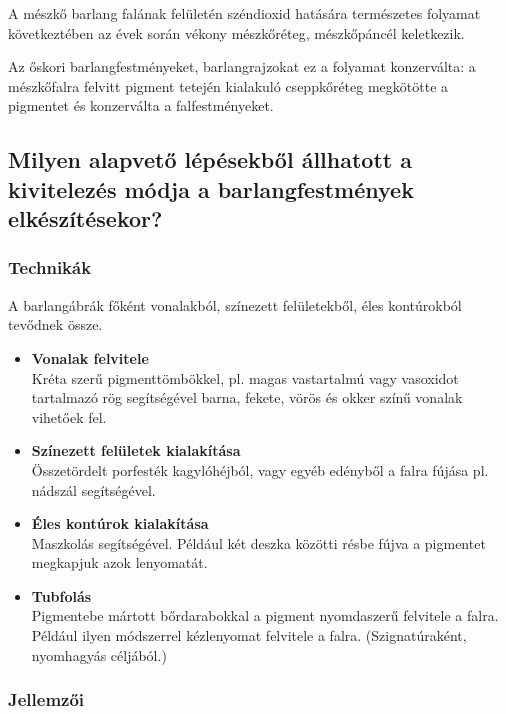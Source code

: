 		A mészkő barlang falának felületén széndioxid hatására természetes folyamat következtében az évek során vékony mészkőréteg, mészkőpáncél keletkezik. 
		
		Az őskori barlangfestményeket, barlangrajzokat ez a folyamat konzerválta: a mészkőfalra felvitt pigment tetején kialakuló cseppkőréteg megkötötte a pigmentet és konzerválta a falfestményeket.
		
		
	\subsection{ Milyen alapvető lépésekből állhatott a kivitelezés módja a barlangfestmények elkészítésekor?}
		
		\subsubsection{Technikák}
		
		A barlangábrák főként vonalakból, színezett felületekből, éles kontúrokból tevődnek össze.
		
		\begin{itemize}
			\item \textbf{Vonalak felvitele}\\
			Kréta szerű pigmenttömbökkel, pl. magas vastartalmú vagy vasoxidot tartalmazó rög segítségével barna, fekete, vörös és okker színű vonalak vihetőek fel.
			
			\item \textbf{Színezett felületek kialakítása}\\
			Összetördelt porfesték kagylóhéjból, vagy egyéb edényből a falra fújása pl. nádszál segítségével.
			
			\item \textbf{Éles kontúrok kialakítása}\\
			Maszkolás segítségével. Például két deszka közötti résbe fújva a pigmentet megkapjuk azok lenyomatát.
			
			\item \textbf{Tubfolás}\\
			Pigmentebe mártott bőrdarabokkal a pigment nyomdaszerű felvitele a falra. Például ilyen módszerrel kézlenyomat felvitele a falra. (Szignatúraként, nyomhagyás céljából.)
		\end{itemize}
	
		\subsubsection{Jellemzői}
		
